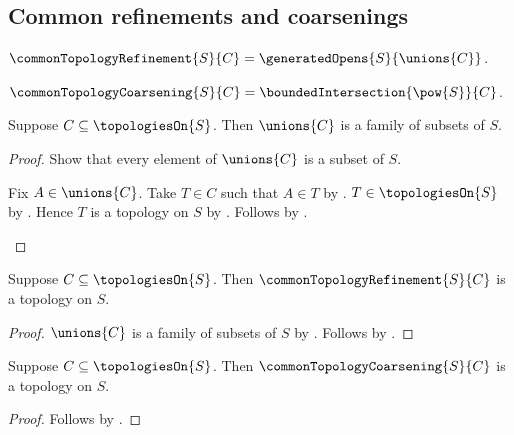 \subsection{Common refinements and coarsenings}

\begin{definition}\label{common_topology_refinement}
    $\commonTopologyRefinement{S}{C}
        =\generatedOpens{S}{\unions{C}}$.
\end{definition}

\begin{definition}\label{common_topology_coarsening}
    $\commonTopologyCoarsening{S}{C}
        =\boundedIntersection{\pow{S}}{C}$.
\end{definition}

\begin{proposition}\label{union_of_topologies_is_family}
    Suppose $C\subseteq\topologiesOn{S}$.
    Then $\unions{C}$ is a family of subsets of $S$.
\end{proposition}
\begin{proof}
    Show that every element of $\unions{C}$ is a subset of $S$.
    \begin{subproof}
        Fix $A\in\unions{C}$.
        Take $T\in C$ such that $A\in T$ by .
        $T\in\topologiesOn{S}$ by .
        Hence $T$ is a topology on $S$ by
            .
        Follows by .
    \end{subproof}
\end{proof}

\begin{classification}\label{common_topology_refinement_is_topology}
    Suppose $C\subseteq\topologiesOn{S}$.
    Then $\commonTopologyRefinement{S}{C}$ is a topology on $S$.
\end{classification}
\begin{proof}
    $\unions{C}$ is a family of subsets of $S$ by
        .
    Follows by
        .
\end{proof}

\begin{classification}\label{common_topology_coarsening_is_topology}
    Suppose $C\subseteq\topologiesOn{S}$.
    Then $\commonTopologyCoarsening{S}{C}$ is a topology on $S$.
\end{classification}
\begin{proof}
    Follows by
        .
\end{proof}

